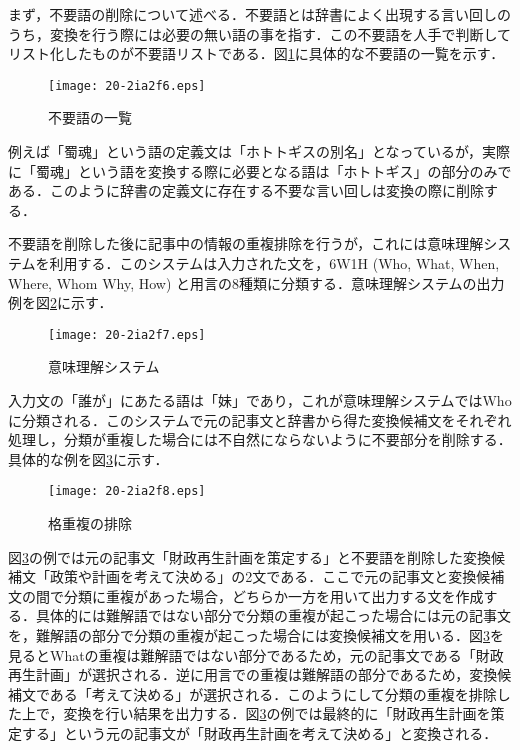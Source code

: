 \documentclass[japanese]{jnlp_1.4}
\begin{document}
まず，不要語の削除について述べる．不要語とは辞書によく出現する言い回しのうち，変換を行う際には必要の無い語の事を指す．この不要語を人手で判断してリスト化したものが不要語リストである．図\ref{fig:fuyougo}に具体的な不要語の一覧を示す．

\begin{figure}[b]
 \begin{center}
  \texttt{[image: 20-2ia2f6.eps]}
 \end{center}
 \caption{不要語の一覧}
 \label{fig:fuyougo}
\end{figure}

例えば「蜀魂」という語の定義文は「ホトトギスの別名」となっているが，実際に「蜀魂」という語を変換する際に必要となる語は「ホトトギス」の部分のみである．このように辞書の定義文に存在する不要な言い回しは変換の際に削除する．

不要語を削除した後に記事中の情報の重複排除を行うが，これには意味理解システム\cite{Article_03}を利用する．このシステムは入力された文を，6W1H (Who, What, When, Where, Whom Why, How) と用言の8種類に分類する．意味理解システムの出力例を図\ref{fig:imirikai}に示す．

\begin{figure}[t]
 \begin{center}
  \texttt{[image: 20-2ia2f7.eps]}
 \end{center}
 \caption{意味理解システム}
 \label{fig:imirikai}
\end{figure}

入力文の「誰が」にあたる語は「妹」であり，これが意味理解システムではWhoに分類される．このシステムで元の記事文と辞書から得た変換候補文をそれぞれ処理し，分類が重複した場合には不自然にならないように不要部分を削除する．具体的な例を図\ref{fig:kakusaku}に示す．

\begin{figure}[t]
 \begin{center}
  \texttt{[image: 20-2ia2f8.eps]}
 \end{center}
 \caption{格重複の排除}
 \label{fig:kakusaku}
\end{figure}

図\ref{fig:kakusaku}の例では元の記事文「財政再生計画を策定する」と不要語を削除した変換候補文「政策や計画を考えて決める」の2文である．ここで元の記事文と変換候補文の間で分類に重複があった場合，どちらか一方を用いて出力する文を作成する．具体的には難解語ではない部分で分類の重複が起こった場合には元の記事文を，難解語の部分で分類の重複が起こった場合には変換候補文を用いる．図\ref{fig:kakusaku}を見るとWhatの重複は難解語ではない部分であるため，元の記事文である「財政再生計画」が選択される．逆に用言での重複は難解語の部分であるため，変換候補文である「考えて決める」が選択される．このようにして分類の重複を排除した上で，変換を行い結果を出力する．図\ref{fig:kakusaku}の例では最終的に「財政再生計画を策定する」という元の記事文が「財政再生計画を考えて決める」と変換される．
\end{document}

